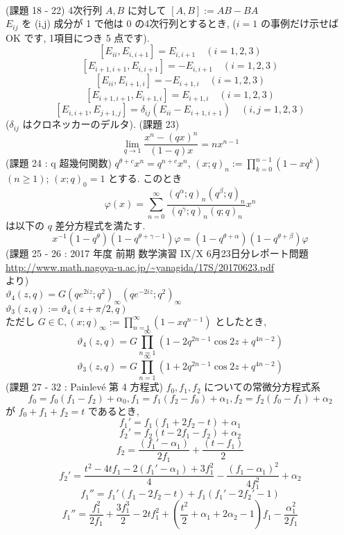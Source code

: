 \documentclass{article}
\begin{document}
\\
(課題 18 - 22) 4次行列 $A,B$ に対して $[A,B] := AB - BA$\\
$E_{ij}$ を (i,j) 成分が 1 で他は 0 の4次行列とするとき, ($i=1$ の事例だけ示せば OK です, 1項目につき 5 点です).\\
\[ [E_{ii}, E_{i,i+1}] = E_{i,i+1} \quad (i=1,2,3) \]
\[ [E_{i+1,i+1}, E_{i,i+1}] = -E_{i,i+1} \quad (i=1,2,3) \]
\[ [E_{ii}, E_{i+1,i}] = -E_{i+1,i} \quad (i=1,2,3) \]
\[ [E_{i+1,i+1}, E_{i+1,i}] = E_{i+1,i} \quad (i=1,2,3) \]
\[ [E_{i,i+1}, E_{j+1,j}] = \delta_{ij} (E_{ii} - E_{i+1,i+1}) \quad (i,j=1,2,3) \]
($\delta_{ij}$ はクロネッカーのデルタ).
(課題 23)
\[ \lim_{q \to 1} \frac{x^n - (qx)^n}{(1 - q)x} = nx^{n-1} \]
\newpage \noindent
(課題 24 : q 超幾何関数) $q^{\theta+c}x^n = q^{n+c}x^n$, $(x;q)_{n} := \prod^{n-1}_{k=0}(1-xq^k)$ $(n \geq 1)$; $(x;q)_0=1$ とする. このとき
\[ \varphi(x) = \sum^{\infty}_{n=0} \frac{(q^{\alpha};q)_n(q^{\beta};q)_n}{(q^{\gamma};q)_n(q;q)_n}x^n \]
は以下の $q$ 差分方程式を満たす.
\[ x^{-1}(1-q^{\theta})(1-q^{\theta+\gamma-1})\varphi = (1-q^{\theta+\alpha})(1-q^{\theta+\beta})\varphi \]
(課題 25 - 26 : 2017 年度 前期 数学演習 IX/X 6月23日分レポート問題\\
\url{http://www.math.nagoya-u.ac.jp/~yanagida/17S/20170623.pdf}\\
より)\\
$\vartheta_4(z,q) = G(qe^{2iz};q^2)_{\infty}(qe^{-2iz};q^2)_{\infty}$\\
$\vartheta_3(z,q) := \vartheta_4(z+\pi/2,q)$\\
ただし $G \in \mathbb{C}, (x;q)_{\infty} := \prod^{\infty}_{n=1} (1 - xq^{n-1})$ としたとき,
\[ \vartheta_4(z,q) = G \prod^{\infty}_{n=1}(1-2q^{2n-1}\cos{2z}+q^{4n-2}) \]
\[ \vartheta_3(z,q) = G \prod^{\infty}_{n=1}(1+2q^{2n-1}\cos{2z}+q^{4n-2}) \]
(課題 27 - 32 : Painlev\'e 第 4 方程式) $f_0,f_1,f_2$ についての常微分方程式系
\[ f_0 = f_0(f_1-f_2)+\alpha_0, f_1 = f_1(f_2-f_0)+\alpha_1, f_2 = f_2(f_0-f_1)+\alpha_2 \]
が $f_0 + f_1 + f_2 = t$ であるとき, 
\[ f_1' = f_1(f_1 + 2f_2- t) + \alpha_1 \]
\[ f_2' = f_2(t - 2f_1 - f_2) + \alpha_2 \]
\[ f_2 = \frac{(f_1' - \alpha_1)}{2f_1} + \frac{(t-f_1)}{2} \]
\[ f_2' = \frac{t^2 - 4tf_1 - 2(f_1' - \alpha_1) + 3f_1^2}{4} - \frac{(f_1 - \alpha_1)^2}{4f_1^2} + \alpha_2 \]
\[ f_1'' = f_1'(f_1 - 2f_2 - t) + f_1(f_1' - 2f_2' - 1) \]
\[ f_1'' = \frac{f_1^2}{2f_1} + \frac{3f_1^3}{2} - 2tf_1^2 + \left(\frac{t^2}{2} + \alpha_1 + 2\alpha_2 - 1 \right)f_1 - \frac{\alpha_1^2}{2f_1} \]
\end{document}
